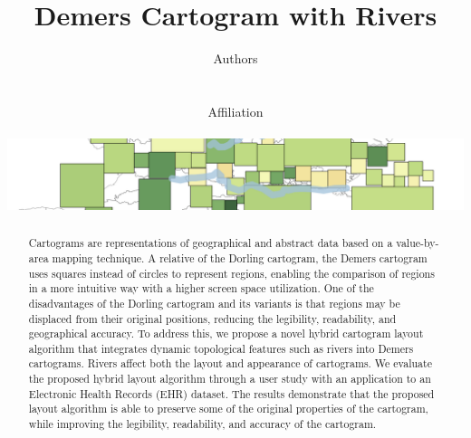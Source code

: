 \documentclass{egpubl}
\begin{document}
\author[Authors]
{
\parbox{\textwidth}{\centering Authors }
\\
\parbox{\textwidth}{\centering Affiliation \\ \begin{center}
        \vspace{2em}
        \includegraphics[width=\textwidth,keepaspectratio]{figure/cover.png}
    \end{center}
}
}

\title{Demers Cartogram with Rivers}

\pagestyle{plain}

\maketitle

\begin{abstract}
    Cartograms are representations of geographical and abstract data based on a value-by-area mapping technique. A relative of the Dorling cartogram, the Demers cartogram uses squares instead of circles to represent regions, enabling the comparison of regions in a more intuitive way with a higher screen space utilization. One of the disadvantages of the Dorling cartogram and its variants is that regions may be displaced from their original positions, reducing the legibility, readability, and geographical accuracy. To address this, we propose a novel hybrid cartogram layout algorithm that integrates dynamic topological features such as rivers into Demers cartograms. Rivers affect both the layout and appearance of cartograms. We evaluate the proposed hybrid layout algorithm through a user study with an application to an Electronic Health Records (EHR) dataset. The results demonstrate that the proposed layout algorithm is able to preserve some of the original properties of the cartogram, while improving the legibility, readability, and accuracy of the cartogram.
\end{abstract}
\end{document}
